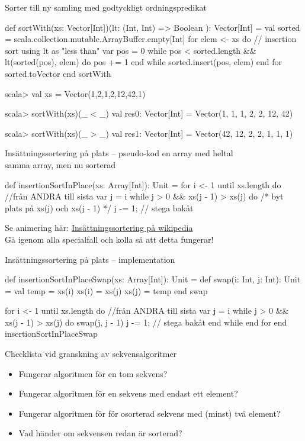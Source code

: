 \begin{Slide}{Sorter till ny samling med godtyckligt ordningspredikat}
\begin{CodeSmall}
def sortWith(xs: Vector[Int])(lt: (Int, Int) => Boolean ): Vector[Int] = 
  val sorted = scala.collection.mutable.ArrayBuffer.empty[Int]
  for elem <- xs do  // insertion sort using lt as "less than"
     var pos = 0
     while pos < sorted.length && lt(sorted(pos), elem) do
       pos += 1
     end while
     sorted.insert(pos, elem)
  end for
  sorted.toVector
end sortWith
\end{CodeSmall}
\pause
\begin{REPL}
scala> val xs = Vector(1,2,1,2,12,42,1)

scala> sortWith(xs)(_ < _)
val res0: Vector[Int] = Vector(1, 1, 1, 2, 2, 12, 42)

scala> sortWith(xs)(_ > _)
val res1: Vector[Int] = Vector(42, 12, 2, 2, 1, 1, 1)
\end{REPL}
\end{Slide}


\begin{Slide}{Insättningssortering på plats -- pseudo-kod}
 en array med heltal\\
 samma array, men nu sorterad\\
\begin{Code}
def insertionSortInPlace(xs: Array[Int]): Unit = 
  for i <- 1 until xs.length do  //från ANDRA till sista
    var j = i
    while j > 0 && xs(j - 1) > xs(j) do
      /* byt plats på xs(j) och xs(j - 1) */
      j -= 1;  // stega bakåt
\end{Code}
\pause
Se animering här: \href{https://sv.wikipedia.org/wiki/Ins\%C3\%A4ttningssortering}{Insättningssortering på wikipedia}\\
Gå igenom alla specialfall och kolla så att detta fungerar!
\end{Slide}

\begin{Slide}{Insättningssortering på plats -- implementation} %
\begin{Code}
def insertionSortInPlaceSwap(xs: Array[Int]): Unit = 
  def swap(i: Int, j: Int): Unit = 
    val temp = xs(i)
    xs(i) = xs(j)
    xs(j) = temp
  end swap 

  for i <- 1 until xs.length do  //från ANDRA till sista
    var j = i
    while j > 0 && xs(j - 1) > xs(j) do
      swap(j, j - 1)
      j -= 1;  // stega bakåt
    end while
  end for
end insertionSortInPlaceSwap
\end{Code}
\end{Slide}

\begin{Slide}{Checklista vid granskning av sekvensalgoritmer}
\begin{itemize}
\item Fungerar algoritmen för en tom sekvens?
\item Fungerar algoritmen för en sekvens med endast ett element?
\item Fungerar algoritmen för för osorterad sekvens med (minst) två element?
\item Vad händer om sekvensen redan är sorterad?
\end{itemize}
\end{Slide}